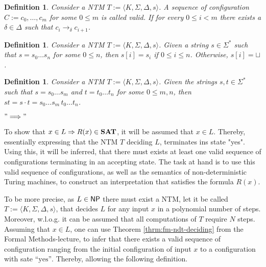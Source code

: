 \documentclass [11pt]{article}
\newtheorem{definition}[theorem]{Definition}
\newtheorem{remark}[theorem]{Remark}
\newcommand{\Ra}{\Rightarrow}
\newcommand{\yess}{\mbox{``yes''}}
\newcommand{\ccfont}[1]{\protect\mathsf{#1}}
\newcommand{\NP}{\ccfont{NP}}
\newcommand{\SAT}{\mbox{\bf SAT}}
\begin{document}
\begin{definition}
Consider a NTM $T:=\langle K, \Sigma, \Delta, s \rangle$. A sequence of configuration $C:= c_0, \dots, c_m$ for some $ 0 \leq m$ is called valid.
If for every $0\leq i < m$ there exists a $\delta	\in \Delta$ such that $c_i \to_{\delta} c_{i+1}$.
\end{definition}


\begin{definition}
Consider a NTM $T:=\langle K, \Sigma, \Delta, s \rangle$. Given a string $s \in \Sigma^*$ such that $s = s_0 \dots s_n$ for some $0\leq n$, then $s[i] = s_{i}$ if $0 \leq i \leq n$. Otherwise, $s[i]=\sqcup$.
\end{definition}


\begin{definition}
Consider a NTM $T:=\langle K, \Sigma, \Delta, s \rangle$. Given the strings $s,t \in \Sigma^*$ such that $s = s_0 \dots s_m$ and $t = t_0 \dots t_n$ for some $0\leq m,n$, then $st= s\cdot t = s_0 \dots s_m\, t_0 \dots t_n$.
\end{definition}





%

$"\Longrightarrow"$
\bigskip

To show that $x \in L \Ra R(x) \in \SAT$, it will be assumed that $x \in L$.  Thereby, essentially expressing that the NTM $T$ deciding $L$, terminates ins state "yes". Using this, it will be inferred, that there must exists at least one
 valid sequence of configurations terminating in an accepting state. The task at hand is to use this valid sequence of configurations, as well as the semantics of non-deterministic Turing machines, to construct an interpretation that satisfies the formula $R(x)$.
 
 
 
To be more precise, as $L \in \NP$ there must exist a NTM, let it be called $T:=\langle K, \Sigma, \Delta, s \rangle$, that decides $L$ for any input $x$ in a polynomial number of steps. Moreover, w.l.o.g. it can be assumed that all computations of $T$ require $N$ steps. 
 Assuming that $x\in L$, one can use Theorem \ref{thrm:fm-ndt-deciding} from the Formal Methods-lecture, to infer that there exists a valid sequence of configuration ranging from the initial configuration of input $x$ to a configuration with sate $\yess$. Thereby, allowing the following definition.
 
\end{document}
